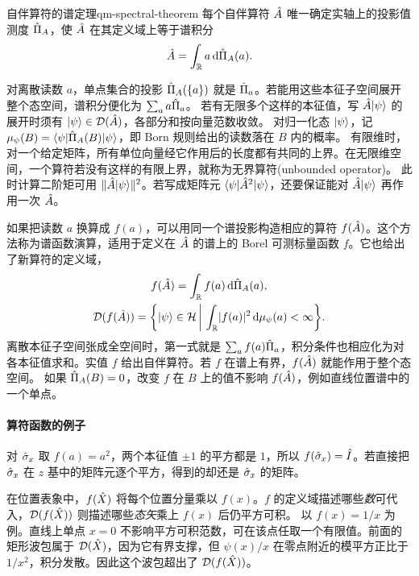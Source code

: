 \begin{theorem}{自伴算符的谱定理}{qm-spectral-theorem}
    每个自伴算符 $\hat{A}$ 唯一确定实轴上的投影值测度 $\hat{\Pi}_A$，使 $\hat{A}$ 在其定义域上等于谱积分
    \begin{equation}
        \hat{A} = \int_{\mathbb{R}}a\mathop{}\!\mathrm{d}\hat{\Pi}_A(a).
    \end{equation}
\end{theorem}
对离散读数 $a$，单点集合的投影 $\hat{\Pi}_A(\{a\})$ 就是 $\hat{\Pi}_a$。若能用这些本征子空间展开整个态空间，谱积分便化为 $\textstyle \sum_a a\hat{\Pi}_a$。
若有无限多个这样的本征值，写 $\hat{A}\lvert\psi\rangle$ 的展开时须有 $\lvert\psi\rangle \in \mathcal D(\hat{A})$，各部分和按向量范数收敛。
对归一化态 $\lvert\psi\rangle$，记 $\mu_\psi(B) = \langle\psi\vert\hat{\Pi}_A(B)\vert\psi\rangle$，即 Born 规则给出的读数落在 $B$ 内的概率。
有限维时，对一个给定矩阵，所有单位向量经它作用后的长度都有共同的上界。在无限维空间，一个算符若没有这样的有限上界，就称为无界算符(unbounded operator)。
此时计算二阶矩可用 $\|\hat{A}\lvert\psi\rangle\|^2$。若写成矩阵元 $\langle\psi\vert\hat{A}^2\vert\psi\rangle$，还要保证能对 $\hat{A}\lvert\psi\rangle$ 再作用一次 $\hat{A}$。

如果把读数 $a$ 换算成 $f(a)$，可以用同一个谱投影构造相应的算符 $f(\hat{A})$。这个方法称为谱函数演算，适用于定义在 $\hat{A}$ 的谱上的 Borel 可测标量函数 $f$。它也给出了新算符的定义域\cite{teschl-forms}，
\begin{subequations}\label{eq:qm-spectral-functional-calculus}
    \begin{gather}
        f(\hat{A}) = \int_{\mathbb{R}} f(a)\mathop{}\!\mathrm{d}\hat{\Pi}_A(a),\\
        \mathcal D(f(\hat{A})) = \biggl\{\lvert\psi\rangle \in \mathcal H\,\bigg\vert\,\int_{\mathbb{R}}\lvert f(a)\rvert^2\mathop{}\!\mathrm{d}\mu_\psi(a) < \infty\biggr\}.
    \end{gather}
\end{subequations}
离散本征子空间张成全空间时，第一式就是 $\textstyle\sum_a f(a)\hat{\Pi}_a$，积分条件也相应化为对各本征值求和。实值 $f$ 给出自伴算符。若 $f$ 在谱上有界，$f(\hat{A})$ 就能作用于整个态空间。
如果 $\hat{\Pi}_A(B) = 0$，改变 $f$ 在 $B$ 上的值不影响 $f(\hat{A})$，例如直线位置谱中的一个单点。

\paragraph{算符函数的例子}
对 $\hat{\sigma}_x$ 取 $f(a) = a^2$，两个本征值 $\pm1$ 的平方都是 $1$，所以 $f(\hat{\sigma}_x) = \hat{I}$。若直接把 $\hat{\sigma}_x$ 在 $z$ 基中的矩阵元逐个平方，得到的却还是 $\hat{\sigma}_x$ 的矩阵。

在位置表象中，$f(\hat{X})$ 将每个位置分量乘以 $f(x)$。$f$ 的定义域描述哪些\emph{数}可代入，$\mathcal D(f(\hat{X}))$ 则描述哪些\emph{态矢}乘上 $f(x)$ 后仍平方可积。
以 $f(x) = 1/x$ 为例。直线上单点 $x = 0$ 不影响平方可积范数，可在该点任取一个有限值。前面的矩形波包属于 $\mathcal D(\hat{X})$，因为它有界支撑，但 $\psi(x)/x$ 在零点附近的模平方正比于 $1/x^2$，积分发散。因此这个波包超出了 $\mathcal D(f(\hat{X}))$。

